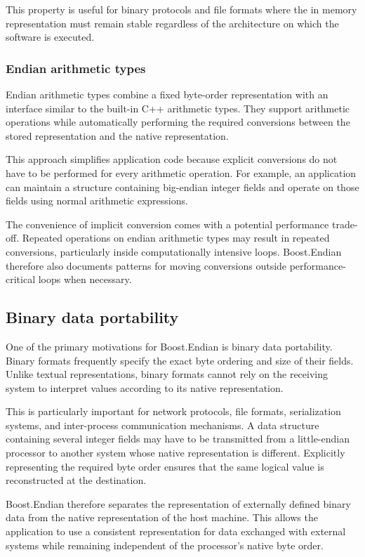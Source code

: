 This property is useful for binary protocols and file formats where the in memory representation must remain stable regardless 
of the architecture on which the software is executed.

\subsubsection{Endian arithmetic types}

Endian arithmetic types combine a fixed byte-order representation with an interface similar to the built-in C++ arithmetic types. 
They support arithmetic operations while automatically performing the required conversions between the stored representation and 
the native representation.

This approach simplifies application code because explicit conversions do not have to be performed for every arithmetic operation. 
For example, an application can maintain a structure containing big-endian integer fields and operate on those fields 
using normal arithmetic expressions.

The convenience of implicit conversion comes with a potential performance trade-off. 
Repeated operations on endian arithmetic types may result in repeated conversions, particularly inside computationally intensive loops. 
Boost.Endian therefore also documents patterns for moving conversions outside performance-critical loops when necessary.

\subsection{Binary data portability}

One of the primary motivations for Boost.Endian is binary data portability. 
Binary formats frequently specify the exact byte ordering and size of their fields. Unlike textual representations, 
binary formats cannot rely on the receiving system to interpret values according to its native representation.

This is particularly important for network protocols, file formats, serialization systems, and inter-process communication mechanisms. 
A data structure containing several integer fields may have to be transmitted from a little-endian processor to another system 
whose native representation is different. 
Explicitly representing the required byte order ensures that the same logical value is reconstructed at the destination.

Boost.Endian therefore separates the representation of externally defined binary data from the native representation of the host machine. 
This allows the application to use a consistent representation for data exchanged with external systems 
while remaining independent of the processor's native byte order.


